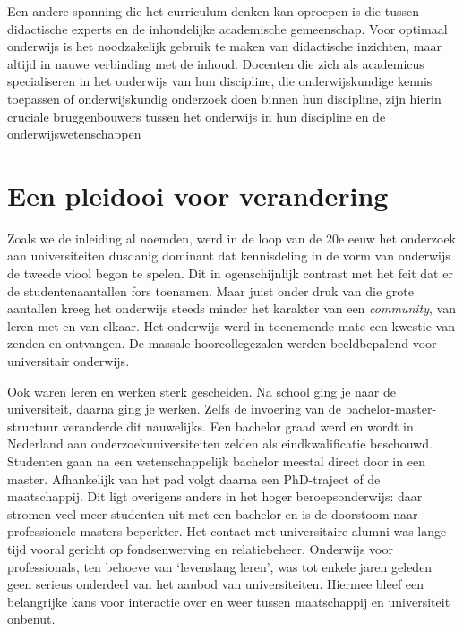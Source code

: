 \documentclass[smallauthor, chapterhaspagenum, nochapterinheader, pagenuminheader,  bigchapnum,medium2, tocpages,  garamond, titleinheader]{jote-book}
\begin{document}
	Een andere spanning die het curriculum-denken kan oproepen is die tussen didactische experts en de inhoudelijke academische gemeenschap. Voor optimaal onderwijs is het noodzakelijk gebruik te maken van didactische inzichten, maar altijd in nauwe verbinding met de inhoud. Docenten die zich als academicus specialiseren in het onderwijs van hun discipline, die onderwijskundige kennis toepassen of onderwijskundig onderzoek doen binnen hun discipline, zijn hierin cruciale bruggenbouwers tussen het onderwijs in hun discipline en de onderwijswetenschappen



	\section{Een pleidooi voor verandering}



	Zoals we de inleiding al noemden, werd in de loop van de 20e eeuw het onderzoek aan universiteiten dusdanig dominant dat kennisdeling in de vorm van onderwijs de tweede viool begon te spelen. Dit in ogenschijnlijk contrast met het feit dat er de studentenaantallen fors toenamen. Maar juist onder druk van die grote aantallen kreeg het onderwijs steeds minder het karakter van een \emph{community}, van leren met en van elkaar. Het onderwijs werd in toenemende mate een kwestie van zenden en ontvangen. De massale hoorcollegezalen werden beeldbepalend voor universitair onderwijs.



	Ook waren leren en werken sterk gescheiden. Na school ging je naar de universiteit, daarna ging je werken. Zelfs de invoering van de bachelor-master-structuur veranderde dit nauwelijks. Een bachelor graad werd en wordt in Nederland aan onderzoekuniversiteiten zelden als eindkwalificatie beschouwd. Studenten gaan na een wetenschappelijk bachelor meestal direct door in een master. Afhankelijk van het pad volgt daarna een PhD-traject of de maatschappij. Dit ligt overigens anders in het hoger beroepsonderwijs: daar stromen veel meer studenten uit met een bachelor en is de doorstoom naar professionele masters beperkter. Het contact met universitaire alumni was lange tijd vooral gericht op fondsenwerving en relatiebeheer. Onderwijs voor professionals, ten behoeve van ‘levenslang leren', was tot enkele jaren geleden geen serieus onderdeel van het aanbod van universiteiten. Hiermee bleef een belangrijke kans voor interactie over en weer tussen maatschappij en universiteit onbenut.
\end{document}
